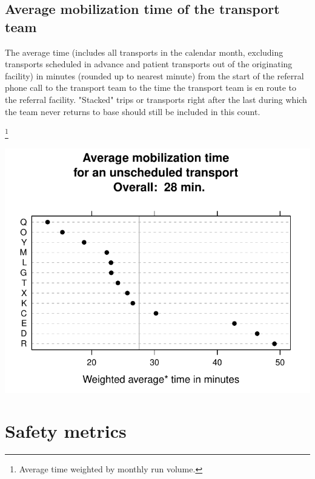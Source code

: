 \documentclass[twoside]{article}\usepackage[]{graphicx}\usepackage[]{color}
\makeatletter
\def\maxwidth{ %
  \ifdim\Gin@nat@width>\linewidth
    \linewidth
  \else
    \Gin@nat@width
  \fi
}
\newenvironment{knitrout}{}{} %
\makeatother
\begin{document}
\newpage
\subsection{Average mobilization time of the transport team}
The average time (includes all transports in the calendar month, excluding transports scheduled in advance and patient transports out of the originating facility) in minutes (rounded up to nearest minute) from the start of the referral phone call to the transport team to the time the transport team is en route to the referral facility. "Stacked" trips or transports right after the last during which the team never returns to base should still be included in this count.

\let\thefootnote\relax\footnote{Average time weighted by monthly run volume.}

\begin{center}
\begin{knitrout}
\color{fgcolor}
\includegraphics[width=\maxwidth]{figure/r_mobilization_time} 

\end{knitrout}

\end{center}







\newpage
\section{Safety metrics}
\end{document}
